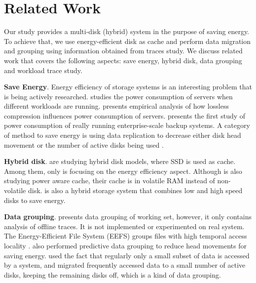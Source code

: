 \section{Related Work} 
\label{related} 

Our study provides a multi-disk (hybrid) system in the purpose of
saving energy. To achieve that, we use energy-efficient disk as cache
and perform data migration and grouping using information obtained
from traces study. We discuss related work that covers the following
aspects: save energy, hybrid disk, data grouping and workload trace
study.

\textbf{Save Energy}. Energy efficiency of storage systems is an
interesting problem that is being actively researched.
\cite{fast10fsgreen} studies the power consumption of servers when
different workloads are running.  \cite{systor09greencomp} presents
empirical analysis of how lossless compression influences power
consumption of servers. \cite{fast12emc-energy} presents the first
study of power consumption of really running enterprise-scale backup
systems. A category of method to save energy is using data replication
to decrease either disk head movement \cite{huangfs2,
pred_data_grouping} or the number of active disks being used
\cite{Weddle07paraid}. 

\textbf{Hybrid disk}. \cite{Bisson07ahybrid, Debnath_SkimpyStash,
Debnath_Bloomflash, flashcache_experiments} are studying hybrid disk
models, where SSD is used as cache. Among them, only
\cite{Bisson07ahybrid} is focusing on the energy efficiency aspect.
Although \cite{Zhu04reducingenergy} is also studying power aware
cache, their cache is in volatile RAM instead of non-volatile disk.
\cite{slow_fast} is also a hybrid storage system that combines low and
high speed disks to save energy.

\textbf{Data grouping}. \cite{Wildani_grouping} presents data
grouping of working set, however, it only contains analysis of offline
traces. It is not implemented or experimented on real system. The
Energy-Efficient File System (EEFS) groups files with high temporal
access locality \cite{Li06highperformance}. \cite{pred_data_grouping}
also performed predictive data grouping to reduce head movements for
saving energy. \cite{migration04} used the fact that regularly only a
small subset of data is accessed by a system, and migrated frequently
accessed data to a small number of active disks, keeping the remaining
disks off, which is a kind of data grouping.


